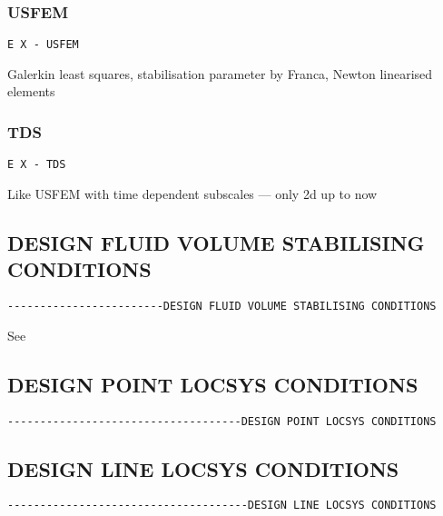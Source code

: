 \subsubsection{USFEM}
\begin{verbatim}
E X - USFEM
\end{verbatim}
Galerkin least squares, stabilisation parameter by Franca, Newton linearised elements
\subsubsection{TDS}
\begin{verbatim}
E X - TDS
\end{verbatim}
Like USFEM with time dependent subscales --- only 2d up to now


\subsection{DESIGN FLUID VOLUME STABILISING CONDITIONS}
\begin{verbatim}
------------------------DESIGN FLUID VOLUME STABILISING CONDITIONS
\end{verbatim}

See 


\subsection{DESIGN POINT LOCSYS CONDITIONS}
\begin{verbatim}
------------------------------------DESIGN POINT LOCSYS CONDITIONS
\end{verbatim}


\subsection{DESIGN LINE LOCSYS CONDITIONS}
\begin{verbatim}
-------------------------------------DESIGN LINE LOCSYS CONDITIONS
\end{verbatim}

